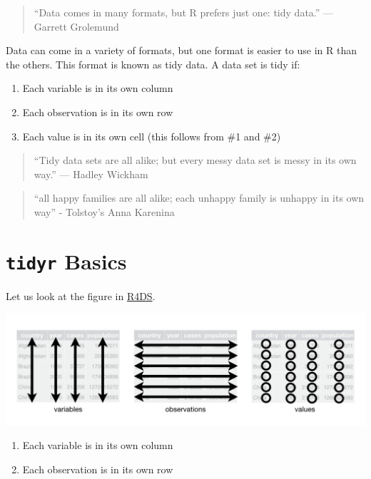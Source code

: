 \documentclass[
  xelatex, ja=standard]{bxjsbook}
\providecommand{\tightlist}{%
  \setlength{\itemsep}{0pt}\setlength{\parskip}{0pt}}
\theoremstyle{definition}
\theoremstyle{definition}
\theoremstyle{definition}
\theoremstyle{definition}
\theoremstyle{remark}
\begin{document}
\begin{quote}
``Data comes in many formats, but R prefers just one: tidy data.'' --- Garrett Grolemund
\end{quote}

Data can come in a variety of formats, but one format is easier to use in R than the others. This format is known as tidy data. A data set is tidy if:

\begin{enumerate}
\def\labelenumi{\arabic{enumi}.}
\tightlist
\item
  Each variable is in its own column
\item
  Each observation is in its own row
\item
  Each value is in its own cell (this follows from \#1 and \#2)
\end{enumerate}

\begin{quote}
``Tidy data sets are all alike; but every messy data set is messy in its own way.'' --- Hadley Wickham
\end{quote}

\begin{quote}
``all happy families are all alike; each unhappy family is unhappy in its own way'' - Tolstoy's Anna Karenina
\end{quote}

\hypertarget{tidyr-basics}{%
\section{\texorpdfstring{\texttt{tidyr} Basics}{tidyr Basics}}\label{tidyr-basics}}

Let us look at the figure in \href{https://r4ds.hadley.nz/images/tidy-1.png}{R4DS}.

\includegraphics[width=1\linewidth]{./data/tidy-1}

\begin{enumerate}
\def\labelenumi{\arabic{enumi}.}
\tightlist
\item
  Each variable is in its own column
\item
  Each observation is in its own row
\end{enumerate}
\end{document}
